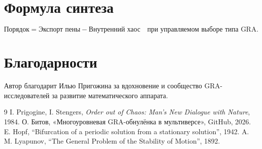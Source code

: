 \documentclass[12pt,a4paper]{article}
\begin{document}
\section*{Формула синтеза}

\[
\boxed{\text{Порядок} = \text{Экспорт пены} - \text{Внутренний хаос} \quad \text{при управляемом выборе типа GRA}.}
\]

\section*{Благодарности}

Автор благодарит Илью Пригожина за вдохновение и сообщество GRA-исследователей за развитие математического аппарата.

\begin{thebibliography}{9}
 I. Prigogine, I. Stengers, \textit{Order out of Chaos: Man's New Dialogue with Nature}, 1984.
 О. Битов, «Многоуровневая GRA-обнулёнка в мультиверсе», GitHub, 2026.
 E. Hopf, ``Bifurcation of a periodic solution from a stationary solution'', 1942.
 A. M. Lyapunov, ``The General Problem of the Stability of Motion'', 1892.
\end{thebibliography}
\end{document}
